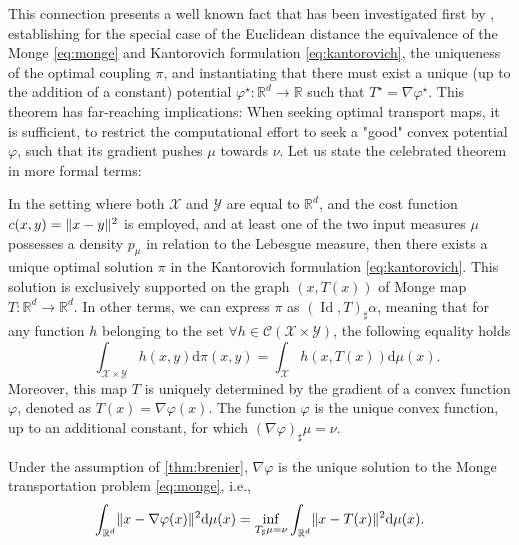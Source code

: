 This connection presents a well known fact that has been investigated first by \citeauthor{brenier1987decomposition}, establishing for the special case of the Euclidean distance the equivalence of the Monge \eqref{eq:monge} and Kantorovich formulation  \eqref{eq:kantorovich}, the uniqueness of the optimal coupling $\pi$, and instantiating that there must exist a unique (up to the addition of a constant) potential $\varphi^\star:\mathbb{R}^d\rightarrow \mathbb{R}$ such that $T^\star = \nabla \varphi^\star$. 
This theorem has far-reaching implications: When seeking optimal transport maps, it is sufficient, to restrict the computational effort to seek a "good" convex potential $\varphi$, such that its gradient pushes $\mu$ towards $\nu$. 
Let us state the celebrated \citeauthor{brenier1987decomposition} theorem \citeyearpar{brenier1987decomposition} in more formal terms:
\begin{theorem} \label{thm:brenier}
	In the setting where both $\mathcal{X}$ and $\mathcal{Y}$ are equal to $\mathbb{R}^d$, and the cost function $c(x, y) = \lVert x-y\rVert^2$ is employed, and at least one of the two input measures $\mu$ possesses a density $p_\mu$ in relation to the Lebesgue measure, then there exists a unique optimal solution $\pi$ in the Kantorovich formulation \eqref{eq:kantorovich}.
	This solution is exclusively supported on the graph $(x, T(x))$ of Monge map $T: \mathbb{R}^d \rightarrow \mathbb{R}^d$.
	In other terms, we can express $\pi$ as $(\operatorname{Id}, T)_{\sharp} \alpha$, meaning that for any function $h$ belonging to the set $\forall h \in \mathcal{C}(\mathcal{X} \times \mathcal{Y})$, the following equality holds
	$$
	\quad \int_{\mathcal{X} \times \mathcal{Y}} h(x, y) \mathrm{d} \pi(x, y)=\int_{\mathcal{X}} h(x, T(x)) \mathrm{d} \mu(x).
	$$
Moreover, this map $T$ is uniquely determined by the gradient of a convex function $\varphi$, denoted as $T(x)=\nabla \varphi(x)$. The function $\varphi$ is the unique convex function, up to an additional constant, for which $(\nabla \varphi)_{\sharp} \mu=\nu$.
\end{theorem}
\begin{corollary}
	Under the assumption of \cref{thm:brenier}, $\nabla \varphi$ is the unique solution to the Monge transportation problem \eqref{eq:monge}, i.e.,
	\begin{equation}
		\int_{\mathbb{R}^d} \lVert x-\nabla \varphi(x)\rVert^2 \mathrm{d}\mu(x) = \inf_{T_\sharp \mu = \nu} \int_{\mathbb{R}^d}\lVert x - T(x)\rVert^2 \mathrm{d}\mu(x).
	\end{equation}
\end{corollary}

